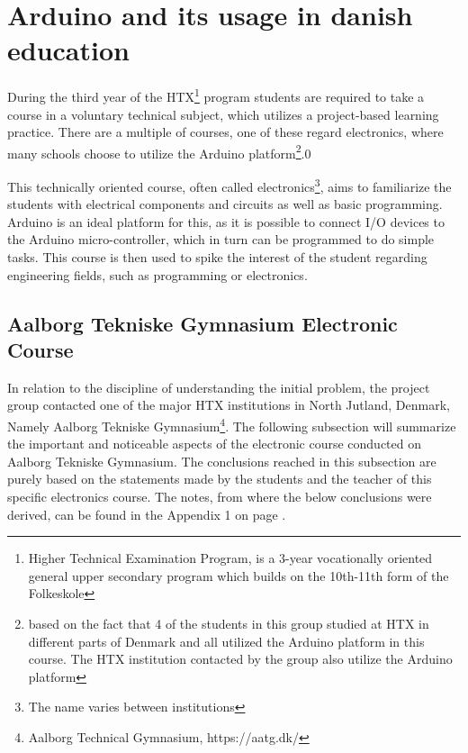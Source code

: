 
\section{Arduino and its usage in danish education}
During the third year of the HTX\footnote{Higher Technical Examination Program, is a 3-year vocationally oriented general upper secondary program which builds on the 10th-11th form of the Folkeskole\cite{htx_wiki}} program students are required to take a course in a voluntary technical subject, which utilizes a project-based learning practice. 
There are a multiple of courses, one of these regard electronics, where many schools choose to utilize the Arduino platform\footnote{based on the fact that 4 of the students in this group studied at HTX in different parts of Denmark and all utilized the Arduino platform in this course. 
The HTX institution contacted by the group also utilize the Arduino platform}\cite{holstebro_education}.0

This technically oriented course, often called electronics\footnote{The name varies between institutions}, aims to familiarize the students with electrical components and circuits as well as basic programming.\cite{holstebro_electronic}
Arduino is an ideal platform for this, as it is possible to connect I/O devices to the Arduino micro-controller, which in turn can be programmed to do simple tasks. 
This course is then used to spike the interest of the student regarding engineering fields, such as programming or electronics.


\subsection{Aalborg Tekniske Gymnasium Electronic Course}
\label{htxinter}
In relation to the discipline of understanding the initial problem, the project group contacted one of the major HTX institutions in North Jutland, Denmark, Namely Aalborg Tekniske Gymnasium\footnote{Aalborg Technical Gymnasium, https://aatg.dk/}. 
The following subsection will summarize the important and noticeable aspects of the electronic course conducted on Aalborg Tekniske Gymnasium. 
The conclusions reached in this subsection are purely based on the statements made by the students and the teacher of this specific electronics course.
The notes, from where the below conclusions were derived, can be found in the Appendix 1 on page \pageref{Interviews}.

